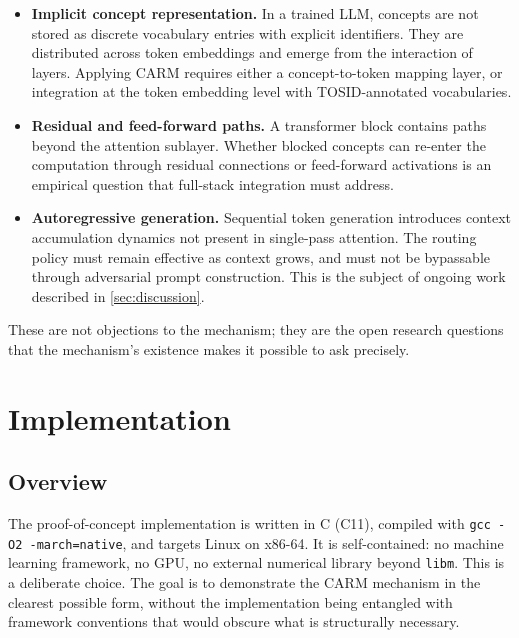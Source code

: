 \documentclass[11pt,a4paper]{article}
\theoremstyle{definition}
\begin{document}
\begin{itemize}
  \item \textbf{Implicit concept representation.} In a trained LLM, concepts are not
        stored as discrete vocabulary entries with explicit identifiers. They are
        distributed across token embeddings and emerge from the interaction of
        layers. Applying CARM requires either a concept-to-token mapping layer, or
        integration at the token embedding level with TOSID-annotated vocabularies.

  \item \textbf{Residual and feed-forward paths.} A transformer block contains paths
        beyond the attention sublayer. Whether blocked concepts can re-enter the
        computation through residual connections or feed-forward activations is an
        empirical question that full-stack integration must address.

  \item \textbf{Autoregressive generation.} Sequential token generation introduces
        context accumulation dynamics not present in single-pass attention. The
        routing policy must remain effective as context grows, and must not be
        bypassable through adversarial prompt construction. This is the subject of
        ongoing work described in \cref{sec:discussion}.
\end{itemize}

These are not objections to the mechanism; they are the open research questions that
the mechanism's existence makes it possible to ask precisely.

\section{Implementation}
\label{sec:implementation}

\subsection{Overview}
\label{sec:implover}

The proof-of-concept implementation is written in C (C11), compiled with
\texttt{gcc -O2 -march=native}, and targets Linux on x86-64. It is
self-contained: no machine learning framework, no GPU, no external numerical
library beyond \texttt{libm}. This is a deliberate choice. The goal is to
demonstrate the CARM mechanism in the clearest possible form, without the
implementation being entangled with framework conventions that would obscure
what is structurally necessary.
\end{document}
